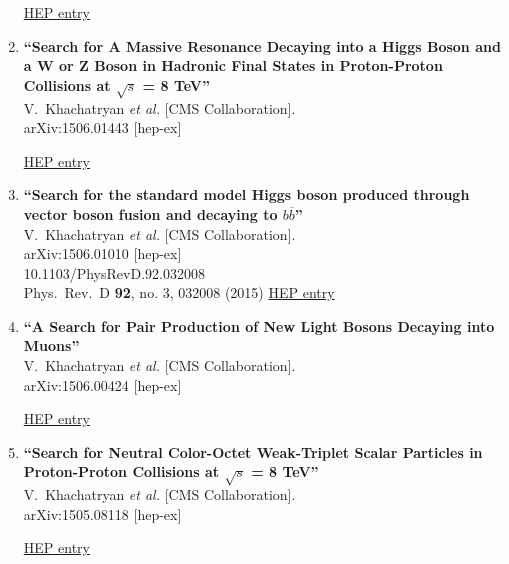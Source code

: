 \documentclass{article}
\begin{document}
\begin{enumerate}
\href{http://inspirehep.net/record/1375026}{HEP entry}


\item%
{\bf ``Search for A Massive Resonance Decaying into a Higgs Boson and a W or Z Boson in Hadronic Final States in Proton-Proton Collisions at $\sqrt{s}$ = 8 TeV''}
  \\{}V.~Khachatryan {\it et al.} [CMS Collaboration].
  \\{}arXiv:1506.01443 [hep-ex]
  
\href{http://inspirehep.net/record/1374621}{HEP entry}


\item%
{\bf ``Search for the standard model Higgs boson produced through vector boson fusion and decaying to $b \overline{b}$''}
  \\{}V.~Khachatryan {\it et al.} [CMS Collaboration].
  \\{}arXiv:1506.01010 [hep-ex]
    \\{}10.1103/PhysRevD.92.032008
\\{}Phys.\ Rev.\ D {\bf 92}, no. 3, 032008 (2015) %
\href{http://inspirehep.net/record/1374219}{HEP entry}


\item%
{\bf ``A Search for Pair Production of New Light Bosons Decaying into Muons''}
  \\{}V.~Khachatryan {\it et al.} [CMS Collaboration].
  \\{}arXiv:1506.00424 [hep-ex]
  
\href{http://inspirehep.net/record/1373914}{HEP entry}


\item%
{\bf ``Search for Neutral Color-Octet Weak-Triplet Scalar Particles in Proton-Proton Collisions at $\sqrt{s}$ = 8 TeV''}
  \\{}V.~Khachatryan {\it et al.} [CMS Collaboration].
  \\{}arXiv:1505.08118 [hep-ex]
  
\href{http://inspirehep.net/record/1373745}{HEP entry}




\end{enumerate}
\end{document}
